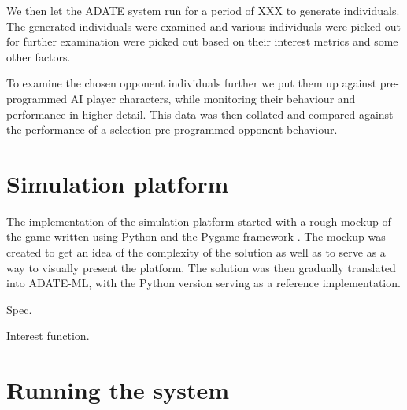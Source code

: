 We then let the ADATE system run for a period of XXX
to generate individuals. The generated individuals were examined and various
individuals were picked out for further examination were picked out based on
their interest metrics and some other factors.

To examine the chosen opponent individuals further we put them up against pre-
programmed AI player characters, while monitoring their behaviour and
performance in higher detail. This data was then collated and compared against
the performance of a selection pre-programmed opponent behaviour.

\section{Simulation platform}
\label{sec:sim-platform}

The implementation of the simulation platform started with a rough mockup of the
game written using Python and the Pygame framework \citep{pygame}. The mockup
was created to get an idea of the complexity of the solution as well as to serve
as a way to visually present the platform. The solution was then gradually
translated into ADATE-ML, with the Python version serving as a reference
implementation.

Spec.

Interest function.

\section{Running the system}
\label{sec:running-system}



